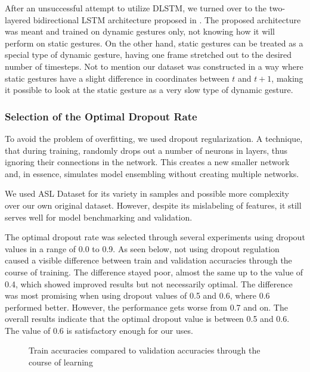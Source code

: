After an unsuccessful attempt to utilize DLSTM, we turned over to the two-layered bidirectional LSTM architecture proposed in \cite{bidirect_dynam}. The proposed architecture was meant and trained on dynamic gestures only, not knowing how it will perform on static gestures. On the other hand, static gestures can be treated as a special type of dynamic gesture, having one frame stretched out to the desired number of timesteps. Not to mention our dataset was constructed in a way where static gestures have a slight difference in coordinates between $t$ and $t+1$, making it possible to look at the static gesture as a very slow type of dynamic gesture.

\subsubsection{Selection of the Optimal Dropout Rate}

To avoid the problem of overfitting, we used dropout regularization. 
A technique, that during training, randomly drops out a number of neurons in layers, thus ignoring their connections in the network. This creates a new smaller network and, in essence, simulates model ensembling without creating multiple networks.

We used ASL Dataset for its variety in samples and possible more complexity over our own original dataset. However, despite its mislabeling of features, it still serves well for model benchmarking and validation.

The optimal dropout rate was selected through several experiments using dropout values in a range of 0.0 to 0.9. As seen below, not using dropout regulation caused a visible difference between train and validation accuracies through the course of training. The difference stayed poor, almost the same up to the value of 0.4, which showed improved results but not necessarily optimal. The difference was most promising when using dropout values of 0.5 and 0.6, where 0.6 performed better. However, the performance gets worse from 0.7 and on. The overall results indicate that the optimal dropout value is between 0.5 and 0.6. The value of 0.6 is satisfactory enough for our uses.

\begin{figure}[h]
    \centering
    \qquad
    \caption{Train accuracies compared to validation accuracies through the course of learning}
\end{figure}

